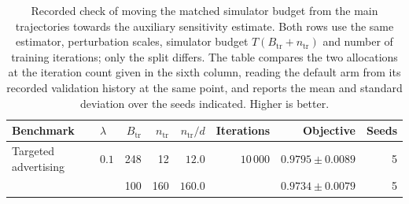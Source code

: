 \begin{table}[H]
\centering
\small
\begin{tabular}{llrrrrrr}
\toprule
Benchmark & $\lambda$ & $B_{\mathrm{tr}}$ & $n_{\mathrm{tr}}$ & $n_{\mathrm{tr}}/d$ & Iterations & Objective & Seeds \\
\midrule
Targeted advertising & $0.1$ & 248 & 12 & $12.0$ & $10\,000$ & $0.9795\pm0.0089$ & 5 \\
 &  & 100 & 160 & $160.0$ &  & $0.9734\pm0.0079$ & 5 \\
\bottomrule
\end{tabular}
\caption{Recorded check of moving the matched simulator budget from the main trajectories towards the auxiliary sensitivity estimate. Both rows use the same estimator, perturbation scales, simulator budget $T(B_{\mathrm{tr}}+n_{\mathrm{tr}})$ and number of training iterations; only the split differs. The table compares the two allocations at the iteration count given in the sixth column, reading the default arm from its recorded validation history at the same point, and reports the mean and standard deviation over the seeds indicated. Higher is better.}
\label{tab:reallocation}
\end{table}
